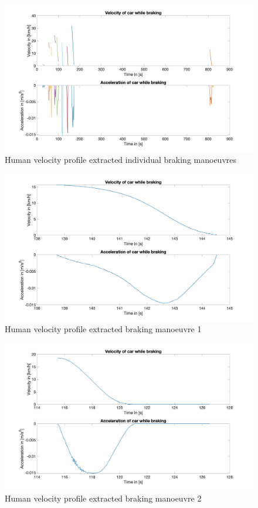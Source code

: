 \begin{figure}[H]
\centering
\includegraphics[width=1\textwidth]{images/D3_individual_braking.jpg}
\caption{Human velocity profile extracted individual braking manoeuvres}
\label{fig:D3_IndividualBraking}
\end{figure}

\begin{figure}[H]
\centering
\includegraphics[width=1\textwidth]{images/D3_example1.jpg}
\caption{Human velocity profile extracted braking manoeuvre 1}
\label{fig:D3_IndividualBraking1}
\end{figure}

\begin{figure}[H]
\centering
\includegraphics[width=1\textwidth]{images/D3_example2.jpg}
\caption{Human velocity profile extracted braking manoeuvre 2}
\label{fig:D3_IndividualBraking2}
\end{figure}

